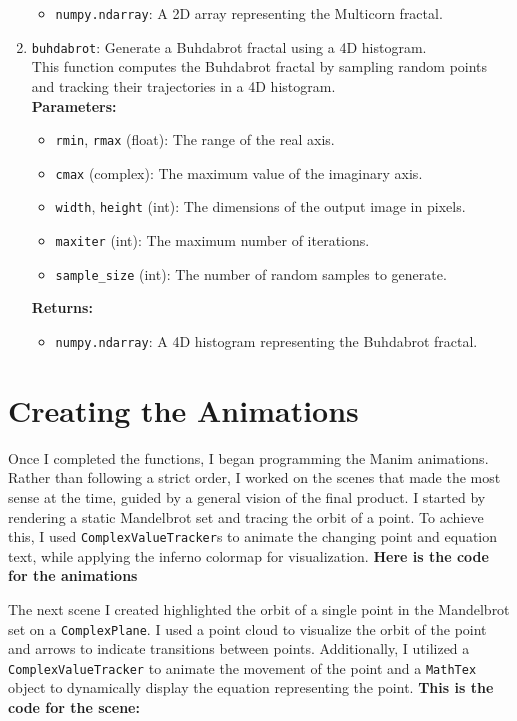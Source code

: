 \documentclass{article}
\begin{document}
\begin{enumerate}
    \begin{itemize}
        \item \texttt{numpy.ndarray}: A 2D array representing the Multicorn fractal.
    \end{itemize}
    \item \texttt{buhdabrot}: Generate a Buhdabrot fractal using a 4D histogram.\\
    This function computes the Buhdabrot fractal by sampling random points and tracking their trajectories in a 4D histogram.\\
    \textbf{Parameters:}
    \begin{itemize}
        \item \texttt{rmin}, \texttt{rmax} (float): The range of the real axis.
        \item \texttt{cmax} (complex): The maximum value of the imaginary axis.
        \item \texttt{width}, \texttt{height} (int): The dimensions of the output image in pixels.
        \item \texttt{maxiter} (int): The maximum number of iterations.
        \item \texttt{sample\_size} (int): The number of random samples to generate.
    \end{itemize}
    \textbf{Returns:}
    \begin{itemize}
        \item \texttt{numpy.ndarray}: A 4D histogram representing the Buhdabrot fractal.
    \end{itemize}
\end{enumerate}

\section{Creating the Animations}
Once I completed the functions, I began programming the Manim animations. Rather than following a strict order,
I worked on the scenes that made the most sense at the time, guided by a general vision of the final product.
I started by rendering a static Mandelbrot set and tracing the orbit of a point. To achieve this,
I used \texttt{ComplexValueTracker}s to animate the changing point and equation text,
while applying the inferno colormap for visualization.
\textbf{Here is the code for the animations}



The next scene I created highlighted the orbit of a single point in the Mandelbrot set on a \texttt{ComplexPlane}. 
I used a point cloud to visualize the orbit of the point and arrows to indicate transitions between points. 
Additionally, I utilized a \texttt{ComplexValueTracker} to animate the movement of the point and a \texttt{MathTex} 
object to dynamically display the equation representing the point.
\textbf{This is the code for the scene:}
\end{document}
